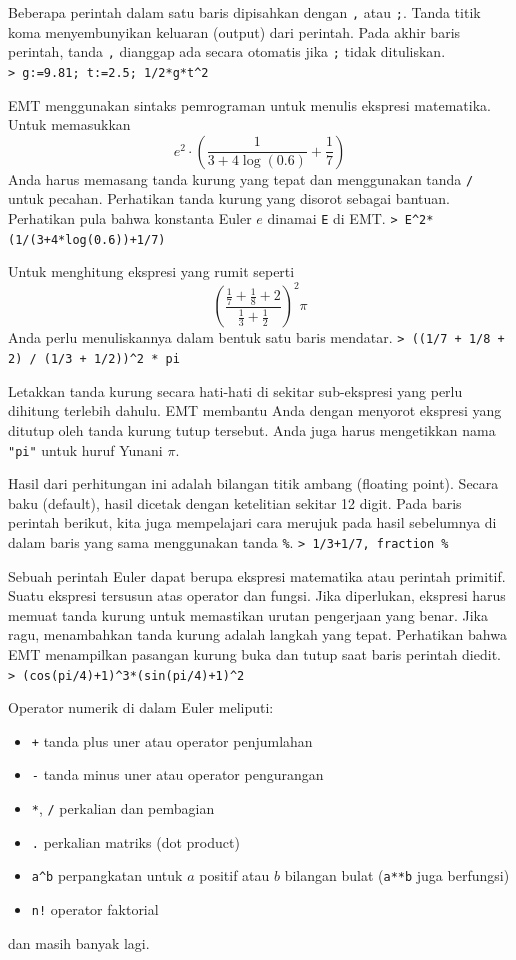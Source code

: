 \documentclass[11pt, a4paper]{article}
\newcommand{\emtcmd}[1]{\noindent\texttt{\textcolor{emtcommand}{>}\ #1}\par\smallskip}
\begin{document}
Beberapa perintah dalam satu baris dipisahkan dengan \texttt{,} atau \texttt{;}. Tanda titik koma menyembunyikan keluaran (output) dari perintah. Pada akhir baris perintah, tanda \texttt{,} dianggap ada secara otomatis jika \texttt{;} tidak dituliskan.
\emtcmd{g:=9.81; t:=2.5; 1/2*g*t\^{}2}

EMT menggunakan sintaks pemrograman untuk menulis ekspresi matematika. Untuk memasukkan
$$e^2 \cdot \left( \frac{1}{3+4 \log(0.6)}+\frac{1}{7} \right)$$
Anda harus memasang tanda kurung yang tepat dan menggunakan tanda \texttt{/} untuk pecahan. Perhatikan tanda kurung yang disorot sebagai bantuan. Perhatikan pula bahwa konstanta Euler $e$ dinamai \texttt{E} di EMT.
\emtcmd{E\^{}2*(1/(3+4*log(0.6))+1/7)}

Untuk menghitung ekspresi yang rumit seperti
$$\left(\frac{\frac{1}{7} + \frac{1}{8} + 2}{\frac{1}{3} + \frac{1}{2}}\right)^2 \pi$$
Anda perlu menuliskannya dalam bentuk satu baris mendatar.
\emtcmd{((1/7 + 1/8 + 2) / (1/3 + 1/2))\^{}2 * pi}

Letakkan tanda kurung secara hati-hati di sekitar sub-ekspresi yang perlu dihitung terlebih dahulu. EMT membantu Anda dengan menyorot ekspresi yang ditutup oleh tanda kurung tutup tersebut. Anda juga harus mengetikkan nama \texttt{"pi"} untuk huruf Yunani $\pi$.

Hasil dari perhitungan ini adalah bilangan titik ambang (floating point). Secara baku (default), hasil dicetak dengan ketelitian sekitar 12 digit. Pada baris perintah berikut, kita juga mempelajari cara merujuk pada hasil sebelumnya di dalam baris yang sama menggunakan tanda \texttt{\%}.
\emtcmd{1/3+1/7, fraction \%}

Sebuah perintah Euler dapat berupa ekspresi matematika atau perintah primitif. Suatu ekspresi tersusun atas operator dan fungsi. Jika diperlukan, ekspresi harus memuat tanda kurung untuk memastikan urutan pengerjaan yang benar. Jika ragu, menambahkan tanda kurung adalah langkah yang tepat. Perhatikan bahwa EMT menampilkan pasangan kurung buka dan tutup saat baris perintah diedit.
\emtcmd{(cos(pi/4)+1)\^{}3*(sin(pi/4)+1)\^{}2}

Operator numerik di dalam Euler meliputi:
\begin{itemize}
    \item \texttt{+} tanda plus uner atau operator penjumlahan
    \item \texttt{-} tanda minus uner atau operator pengurangan
    \item \texttt{*}, \texttt{/} perkalian dan pembagian
    \item \texttt{.} perkalian matriks (dot product)
    \item \texttt{a\^{}b} perpangkatan untuk $a$ positif atau $b$ bilangan bulat (\texttt{a**b} juga berfungsi)
    \item \texttt{n!} operator faktorial
\end{itemize}
dan masih banyak lagi.
\end{document}
